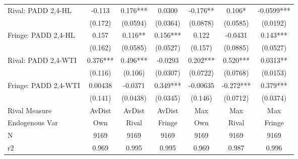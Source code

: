 {\begin{tabular}{l*{6}{c}}
\addlinespace
Rival: PADD 2,4-HL&   -0.113   &    0.176***&   0.0300   &   -0.176** &    0.106*  &  -0.0599***\\
                &  (0.172)   & (0.0594)   & (0.0364)   & (0.0878)   & (0.0585)   & (0.0192)   \\
\addlinespace
Fringe: PADD 2,4-HL&    0.157   &    0.116** &    0.156***&    0.122   &  -0.0431   &    0.143***\\
                &  (0.162)   & (0.0585)   & (0.0527)   &  (0.157)   & (0.0885)   & (0.0527)   \\
\addlinespace
Rival: PADD 2,4-WTI&    0.376***&    0.496***&  -0.0293   &    0.202***&    0.520***&   0.0313** \\
                &  (0.116)   &  (0.106)   & (0.0307)   & (0.0722)   & (0.0768)   & (0.0153)   \\
\addlinespace
Fringe: PADD 2,4-WTI&  0.00438   &  -0.0371   &    0.349***& -0.00635   &   -0.272***&    0.379***\\
                &  (0.141)   & (0.0438)   & (0.0345)   &  (0.146)   & (0.0712)   & (0.0374)   \\
\midrule
Rival Measure   &   AvDist   &   AvDist   &   AvDist   &      Max   &      Max   &      Max   \\
Endogenous Var  &      Own   &    Rival   &   Fringe   &      Own   &    Rival   &   Fringe   \\
N               &     9169   &     9169   &     9169   &     9169   &     9169   &     9169   \\
r2              &    0.969   &    0.995   &    0.995   &    0.969   &    0.987   &    0.996   \\
\bottomrule
\end{tabular}
}
